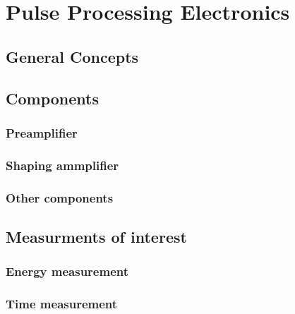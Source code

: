 \section{Pulse Processing Electronics}
\subsection{General Concepts}
\subsection{Components}
\subsubsection{Preamplifier}
\subsubsection{Shaping ammplifier}
\subsubsection{Other components}
\subsection{Measurments of interest}
\subsubsection{Energy measurement}
\subsubsection{Time measurement}